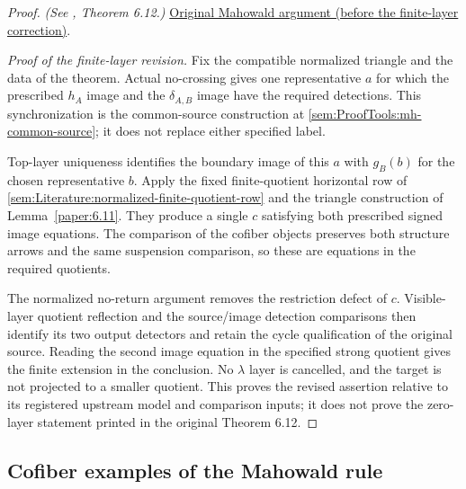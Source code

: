 \begin{proof}
\textit{(See \cite{LWX126}, Theorem 6.12.)} \href{paper/main.tex.html#L1860}{Original Mahowald argument (before the finite-layer correction)}.

\textit{Proof of the finite-layer revision.} Fix the compatible normalized triangle and the data of the theorem. Actual no-crossing gives one representative $a$ for which the prescribed $h_A$ image and the $\delta_{A,B}$ image have the required detections. This synchronization is the common-source construction at \ref{sem:ProofTools:mh-common-source}; it does not replace either specified label.

Top-layer uniqueness identifies the boundary image of this $a$ with $g_B(b)$ for the chosen representative $b$. Apply the fixed finite-quotient horizontal row of \ref{sem:Literature:normalized-finite-quotient-row} and the triangle construction of Lemma~\ref{paper:6.11}. They produce a single $c$ satisfying both prescribed signed image equations. The comparison of the cofiber objects preserves both structure arrows and the same suspension comparison, so these are equations in the required quotients.

The normalized no-return argument removes the restriction defect of $c$. Visible-layer quotient reflection and the source/image detection comparisons then identify its two output detectors and retain the cycle qualification of the original source. Reading the second image equation in the specified strong quotient gives the finite extension in the conclusion. No $\lambda$ layer is cancelled, and the target is not projected to a smaller quotient. This proves the revised assertion relative to its registered upstream model and comparison inputs; it does not prove the zero-layer statement printed in the original Theorem 6.12.
\end{proof}

\subsection{Cofiber examples of the Mahowald rule}

